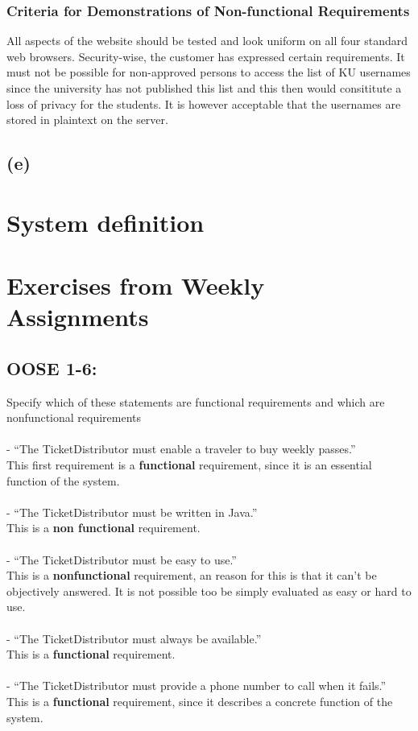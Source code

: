 \documentclass[11pt,a4paper]{article}
\begin{document}
\subsubsection{Criteria for Demonstrations of Non-functional Requirements}
All aspects of the website should be tested and look uniform on all four standard web browsers.
Security-wise, the customer has expressed certain requirements. It must not be possible for non-approved persons to access the list of KU usernames since the university has not published this list and this then would consititute a loss of privacy for the students. It is however acceptable that the usernames are stored in plaintext on the server.
\subsection{(e)}
\section{System definition}


\newpage
\section{Exercises from Weekly Assignments}

\subsection{OOSE 1-6:}
Specify which of these statements are functional requirements and which are
nonfunctional requirements\\\\
- “The TicketDistributor must enable a traveler to buy weekly passes.”\\
This first requirement is a \textbf{functional} requirement, since it is an essential function of the system.\\\\
- “The TicketDistributor must be written in Java.”\\
This is a \textbf{non functional} requirement.\\\\
- “The TicketDistributor must be easy to use.”\\
This is a \textbf{nonfunctional} requirement, an reason for this is that it can't be objectively answered. It is not possible too be simply evaluated as easy or hard to use.\\\\
- “The TicketDistributor must always be available.”\\
This is a \textbf{functional} requirement. \\\\
- “The TicketDistributor must provide a phone number to call when it fails.” \\
This is a \textbf{functional} requirement, since it describes a concrete function of the system.\\
\end{document}
